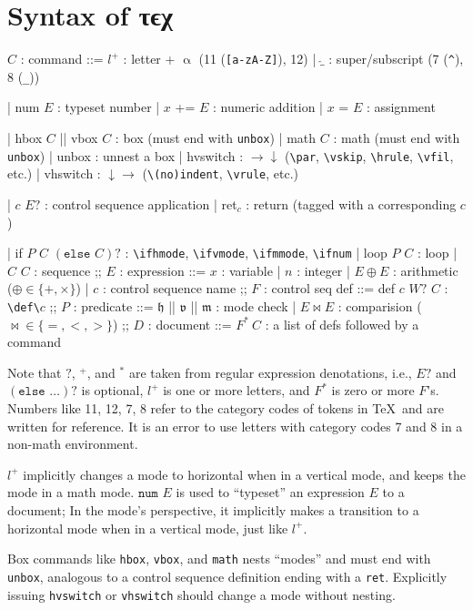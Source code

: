 \documentclass[a4paper]{article}
\newcommand*{\tex}{τϵχ}
\newcommand*{\mode}[1]{\mathfrak{#1}}
\newcommand*\mac[1]{\texttt{\textbackslash #1}}
\begin{document}
\section{Syntax of \tex}
\begin{bnfgrammar}
  $C$ : command ::=
    $l^+$ : letter + $\upalpha$ (11 (\texttt{[a-zA-Z]}), 12)
  | $\hat\_$ : super/subscript (7 (\texttt{\^{}}), 8 (\texttt{\_}))

  | num $E$ : typeset number
  | $x$ += $E$ : numeric addition
  | $x$ = $E$ : assignment

  | hbox $C$ || vbox $C$ : box (must end with \texttt{unbox})
  | math $C$ : math (must end with \texttt{unbox})
  | unbox : unnest a box
  | hvswitch : $\rightarrow\downarrow$ (\mac{par}, \mac{vskip}, \mac{hrule}, \mac{vfil}, etc.)
  | vhswitch : $\downarrow\rightarrow$ (\mac{(no)indent}, \mac{vrule}, etc.)

  | $c$ $E?$ : control sequence application
  | ret$_c$ : return (tagged with a corresponding $c$)

  | if $P$ $C$ $(\texttt{else }C)?$ : \mac{ifhmode}, \mac{ifvmode}, \mac{ifmmode}, \mac{ifnum}
  | loop $P$ $C$ : loop
  | $C$ $C$ : sequence
;;
  $E$ : expression ::=
    $x$ : variable
  | $n$ : integer
  | $E \oplus E$ : arithmetic (${\oplus} \in \{+, \times\}$)
  | $c$ : control sequence name
;;
  $F$ : control seq def ::=
    def $c$ $W?$ $C$ : \mac{def\textbackslash$c$}
;;
  $P$ : predicate ::=
    $\mode{h}$ || $\mode{v}$ || $\mode{m}$ : mode check
  | $E \bowtie E$ : comparision (${\bowtie} \in \{=, <, >\}$)
;;
  $D$ : document ::=
    $F^*\ C$ : a list of defs followed by a command
\end{bnfgrammar}
Note that $?$, ${}^+$, and ${}^*$ are taken from regular expression denotations, i.e., $E?$ and $(\texttt{else }\dots)?$ is optional, $l^+$ is one or more letters, and $F^*$ is zero or more $F$'s.
Numbers like 11, 12, 7, 8 refer to the category codes of tokens in \TeX\ and are written for reference.
It is an error to use letters with category codes 7 and 8 in a non-math environment.

$l^+$ implicitly changes a mode to horizontal when in a vertical mode, and keeps the mode in a math mode.
$\texttt{num }E$ is used to ``typeset'' an expression $E$ to a document; In the mode's perspective, it implicitly makes a transition to a horizontal mode when in a vertical mode, just like $l^+$.

Box commands like \verb/hbox/, \verb/vbox/, and \verb/math/ nests ``modes'' and must end with \verb/unbox/, analogous to a control sequence definition ending with a \verb/ret/.
Explicitly issuing \verb/hvswitch/ or \verb/vhswitch/ should change a mode without nesting.
\end{document}
